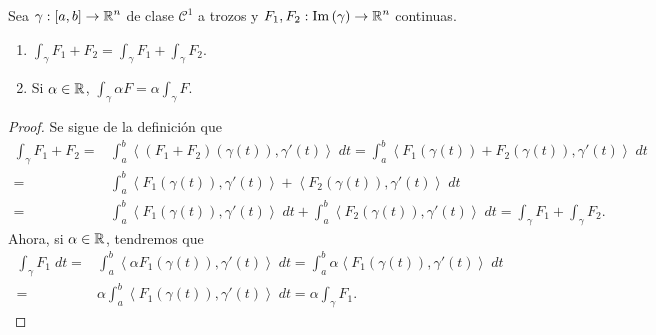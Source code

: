 \begin{prop}[Linealidad]
	Sea $\displaystyle \gamma : \left[a,b\right] \to \mathbb{R}^{n} $ de clase $\displaystyle \mathcal{C}^{1} $ a trozos y $\displaystyle F_{1}, F_{2} : \operatorname{Im}\left(\gamma \right)\to \mathbb{R}^{n} $ continuas. 
\begin{enumerate}
\item $\displaystyle \int _{\gamma }F_{1} + F_{2} = \int _{\gamma }F_{1} + \int _{\gamma }F_{2} $. 
\item Si $\displaystyle \alpha \in \mathbb{R} $, $\displaystyle \int _{\gamma }\alpha F =\alpha \int _{\gamma }F $. 
\end{enumerate}
\end{prop}
\begin{proof}
Se sigue de la definición que
\[
\begin{split}
	\int _{\gamma }F_{1} + F_{2} =& \int^{b}_{a} \left\langle \left(F_{1} + F_{2}\right)\left(\gamma\left(t\right)\right), \gamma'\left(t\right) \right\rangle  \; dt=\int^{b}_{a} \left\langle F_{1}\left(\gamma\left(t\right)\right)+F_{2}\left(\gamma\left(t\right)\right), \gamma'\left(t\right) \right\rangle  \; dt \\
	= & \int^{b}_{a} \left\langle F_{1}\left(\gamma\left(t\right)\right), \gamma'\left(t\right) \right\rangle +\left\langle F_{2}\left(\gamma\left(t\right)\right), \gamma'\left(t\right) \right\rangle  \; dt \\
	= &  \int^{b}_{a} \left\langle F_{1}\left(\gamma\left(t\right)\right), \gamma'\left(t\right) \right\rangle  \; dt + \int^{b}_{a} \left\langle F_{2}\left(\gamma\left(t\right)\right), \gamma'\left(t\right) \right\rangle  \; dt 
	=  \int _{\gamma }F_{1} +\int _{\gamma }F_{2} .
\end{split}
\]
Ahora, si $\displaystyle \alpha \in \mathbb{R} $, tendremos que
\[
\begin{split}
	\int _{\gamma} F_{1}  \; dt =& \int^{b}_{a} \left\langle \alpha F_{1}\left(\gamma\left(t\right)\right), \gamma'\left(t\right) \right\rangle \; dt = \int^{b}_{a} \alpha \left\langle F_{1}\left(\gamma\left(t\right)\right), \gamma'\left(t\right) \right\rangle  \; dt \\
	= &  \alpha \int^{b}_{a} \left\langle F_{1}\left(\gamma\left(t\right)\right), \gamma'\left(t\right) \right\rangle  \; dt = \alpha \int _{\gamma }F_{1} .
\end{split}
\]
\end{proof}

